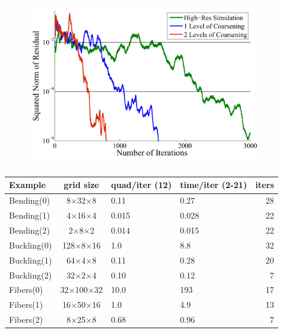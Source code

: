 \begin{figure}
	\includegraphics[width=0.9\textwidth]{figs/CGConverge.pdf}
	\caption{
	}\label{fig:cg}
\end{figure}

\begin{table}
	\centering
	\footnotesize
	\begin{tabular}{l c p{1cm} p{1cm} r }
		\hline 
		\textbf{Example} &\textbf{grid size}&\textbf{quad/iter} (12)&\textbf{time/iter} (2-21)&\textbf{iters}\\
		\hline 
		{\color{HiResColor}Bending(0)} &8$\times$32$\times$8   &  0.11  &0.27 &28\\
		{\color{DDFEMColor}Bending(1)} &4$\times$16$\times$4   &  0.015 &0.028&22\\
		{\color{DDFEMColor}Bending(2)} &2$\times$8$\times$2    &  0.014 &0.015&22\\
		\hline
		{\color{HiResColor}Buckling(0)} &128$\times$8$\times$16&  1.0   &8.8 &32\\
		{\color{DDFEMColor}Buckling(1)} &64$\times$4$\times$8  &  0.11  &0.28&20\\
		{\color{DDFEMColor}Buckling(2) }&32$\times$2$\times$4  &  0.10  &0.12&7\\
		\hline
		{\color{HiResColor}Fibers(0)} &32$\times$100$\times$32 & 10.0   &193&17\\
		{\color{DDFEMColor}Fibers(1)} &16$\times$50$\times$16  &  1.0   &4.9&13\\
		{\color{DDFEMColor}Fibers(2)} &8$\times$25$\times$8    &  0.68  &0.96&7\\
		\hline
	\end{tabular}
	\caption{}
	\label{table:quadPerformance}
\end{table}
